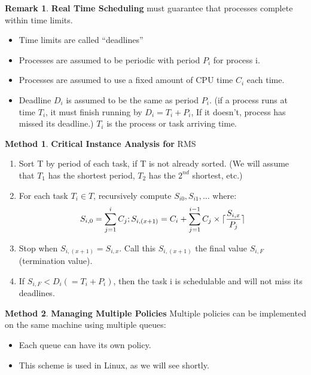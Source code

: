 \documentclass[12pt,a4paper]{article}
\theoremstyle{definition}
\newtheorem*{remark}{Remark}
\newtheorem{method}{Method}[section]
\DeclarePairedDelimiter\ceil{\lceil}{\rceil}
\newenvironment{myitemize}
{ \begin{itemize}
    \setlength{\itemsep}{5pt}
    \setlength{\parskip}{0pt}
    \setlength{\parsep}{0pt}     }
{ \end{itemize}                  }
\newenvironment{myenumerate}
{ \begin{enumerate}
    \setlength{\itemsep}{5pt}
    \setlength{\parskip}{0pt}
    \setlength{\parsep}{0pt}     }
{ \end{enumerate}                }
\begin{document}
\begin{remark}{\textbf{Real Time Scheduling}}
	must guarantee that processes complete within time limits.
	
	\begin{myitemize}
		\item Time limits are called “deadlines”
		\item Processes are assumed to be periodic with period $P_i$ for process i.
		\item Processes are assumed to use a fixed amount of CPU time $C_i$ each time.
		\item Deadline $D_i$ is assumed to be the same as period $P_i$. (if a process runs at time $T_i$, it must finish running by $D_i=T_i+P_i$, If it doesn’t, process has missed its deadline.) $T_i$ is the process or task arriving time.
	\end{myitemize}
\end{remark}

\begin{method}{\textbf{Critical Instance Analysis for} \textsf{RMS}}
	\begin{myenumerate}
		\item Sort T by period of each task, if T is not already sorted. (We will assume that $T_1$ has the shortest period, $T_2$ has the $2^{nd}$ shortest, etc.)
		\item For each task $T_i \in T$, recursively compute $S_{i0}, S_{i1}, \dots$ where:
		\[ S_{i,0}=\sum^i_{j=1}C_j; S_{i,(x+1)}=C_i+\sum^{i-1}_{j=1}C_j\times \ceil{\frac{S_{i,x}}{P_j}}  \]
		\item Stop when $S_{i,(x+1)}=S_{i,x}$. Call this $S_{i,(x+1)}$ the final value $S_{i,F}$ (termination value).
		\item If $S_{i,F}<D_i (=T_i+P_i)$, then the task i is schedulable and will not miss its deadlines.
	\end{myenumerate}
\end{method}

\begin{method}{\textbf{Managing Multiple Policies}}
	Multiple policies can be implemented on the same machine using multiple queues:
	\begin{myitemize}
		\item Each queue can have its own policy.
		\item This scheme is used in Linux, as we will see shortly.
	\end{myitemize}
\end{method}
\end{document}
